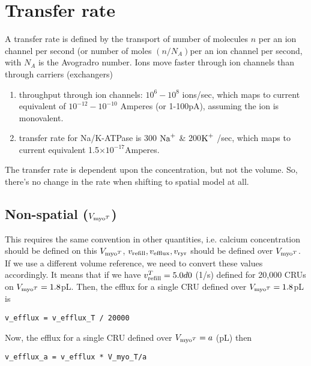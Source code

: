 \section{Transfer rate}
\label{sec:transfer_rate}


A transfer rate is defined by the transport of number of molecules $n$ per an
ion channel per second (or number of moles $(n/N_A)$per an ion channel per
second, with $N_A$ is the Avogradro number. Ions move faster through ion
channels than through carriers (exchangers)
\begin{enumerate}
  \item throughput through ion channels: $10^6-10^8$ ions/sec, which maps to
  current equivalent of $10^{-12}-10^{-10}$ Amperes (or 1-100pA), assuming the
  ion is monovalent. 
  \item transfer rate for Na/K-ATPase is 300 ${\text{Na}^+}$ \& 200${\text{K}^+}$ /sec, which maps
  to current equivalent 1.5$\times 10^{-17}$Amperes. 
\end{enumerate}

The transfer rate is dependent upon the concentration, but not the volume. So,
there's no change in the rate when shifting to spatial model at all.

\subsection{Non-spatial ($V_{\text{myo}^T}$)}
\label{sec:transfer_rate-non_spatial}

This requires the same convention in other quantities, i.e. calcium
concentration should be defined on this $V_{\text{myo}^T}$, $v_{\text{refill}}, v_{\text{efflux}}, v_{\text{ryr}}$ should
be defined over $V_{\text{myo}^T}$. If we use a different volume reference, we need to
convert these values accordingly. It means that if we have $v_{\text{refill}}^T=5.0d0$
(1/s) defined for 20,000 CRUs on $V_{\text{myo}^T}=1.8$pL. Then, the efflux for a single
CRU defined over $V_{\text{myo}^T}=1.8$pL is 
\begin{verbatim}
v_efflux = v_efflux_T / 20000
\end{verbatim}
Now, the efflux for a single CRU defined over $V_{\text{myo}^T}=a$ (pL) then
\begin{verbatim}
v_efflux_a = v_efflux * V_myo_T/a
\end{verbatim}

